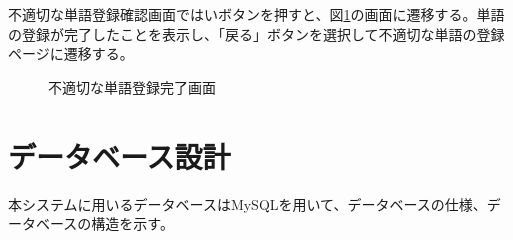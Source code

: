 \documentclass[a4j]{jarticle}
\begin{document}
不適切な単語登録確認画面ではいボタンを押すと、図\ref{fig:NGword_ok}の画面に遷移する。単語の登録が完了したことを表示し、「戻る」ボタンを選択して不適切な単語の登録ページに遷移する。
\begin{figure}[H]
\centering
{}
\caption{不適切な単語登録完了画面}
\label{fig:NGword_ok}
\end{figure}

\section{データベース設計}
本システムに用いるデータベースはMySQLを用いて、データベースの仕様、データベースの構造を示す。
\end{document}
